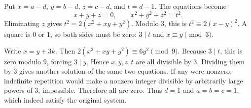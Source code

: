 Put $x=a-d$, $y=b-d$, $z=c-d$, and $t=d-1$. The equations become
\[
x+y+z=0,\qquad x^2+y^2+z^2=t^2.
\]
Eliminating $z$ gives $t^2=2(x^2+xy+y^2)$. Modulo $3$, this is $t^2\equiv2(x-y)^2$. A square is $0$ or $1$, so both sides must be zero: $3\mid t$ and $x\equiv y\pmod3$.

Write $x=y+3k$. Then $2(x^2+xy+y^2)\equiv6y^2\pmod9$. Because $3\mid t$, this is zero modulo $9$, forcing $3\mid y$. Hence $x,y,z,t$ are all divisible by $3$. Dividing them by $3$ gives another solution of the same two equations. If any were nonzero, indefinite repetition would make a nonzero integer divisible by arbitrarily large powers of $3$, impossible. Therefore all are zero. Thus $d=1$ and $a=b=c=1$, which indeed satisfy the original system.
